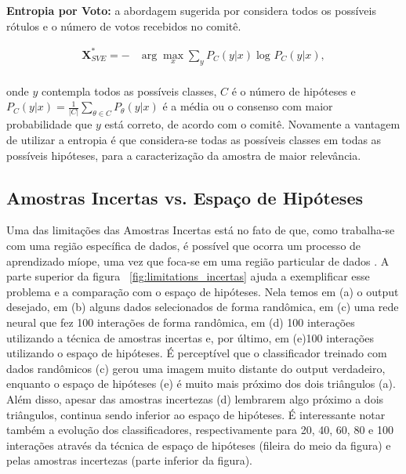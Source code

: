 \textbf{Entropia por Voto:} a abordagem sugerida por \citep{dagan1995committee} considera todos os possíveis rótulos e o número de votos recebidos no comitê. 

\begin{align*}
\textbf{X}^*_{SVE} = - &\arg\max_{x} \sum_{y} P_{C}  (y\lvert x) \log_{} P_{C}  (y\lvert x),\\
\end{align*}

onde $y$ contempla todos as possíveis classes, $C$ é o número de hipóteses e $P_{C}  (y\lvert x) = \frac{1}{|C|}  \sum_{\theta \in C} P_{\theta}  (y\lvert x)$ é a média ou o consenso com maior probabilidade que $y$ está correto, de acordo com o comitê. Novamente a vantagem de utilizar a entropia é que considera-se todas as possíveis classes em todas as possíveis hipóteses, para a caracterização da amostra de maior relevância.


\subsection{Amostras Incertas vs. Espaço de Hipóteses} 
\label{sec:minimizing_expected}

Uma das limitações das Amostras Incertas está no fato de que, como trabalha-se com uma região específica de dados, é possível que ocorra um processo de aprendizado míope, uma vez que foca-se em uma região particular de dados \citep{settles2014active}. A parte superior da figura ~\ref{fig:limitations_incertas} ajuda a exemplificar esse problema e a comparação com o espaço de hipóteses. Nela temos em (a) o output desejado, em (b) alguns dados selecionados de forma randômica, em (c) uma rede neural que fez 100 interações de forma randômica, em (d) 100 interações utilizando a técnica de amostras incertas e, por último, em (e)100 interações utilizando o espaço de hipóteses. É perceptível que o classificador treinado com dados randômicos (c) gerou uma imagem muito distante do output verdadeiro, enquanto o espaço de hipóteses (e) é muito mais próximo dos dois triângulos (a). Além disso, apesar das amostras incertezas (d) lembrarem algo próximo a dois triângulos, continua sendo inferior ao espaço de hipóteses. É interessante notar também a evolução dos classificadores, respectivamente para 20, 40, 60, 80 e 100 interações através da técnica de espaço de hipóteses (fileira do meio da figura) e pelas amostras incertezas (parte inferior da figura).

